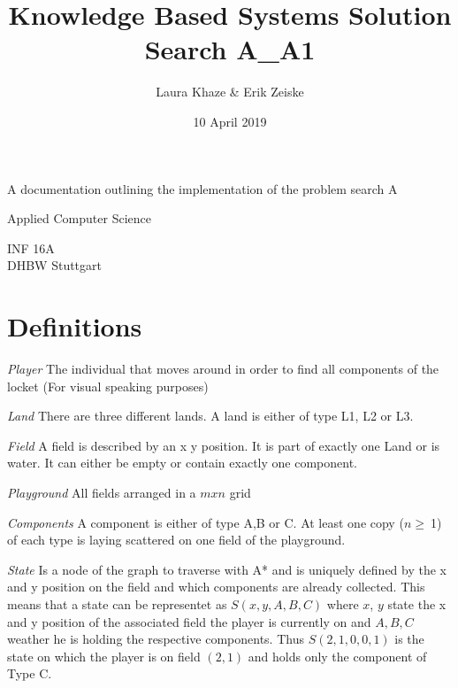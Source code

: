 \documentclass{article}
\title{Knowledge Based Systems Solution Search A\_A1}
\author{Laura Khaze \& Erik Zeiske}
\date{10 April 2019}
\begin{document}
\begin{titlepage}
    \begin{center}
        \vspace*{1cm}
 
        \Huge
        \textbf{\@title}
 
        \vspace{0.5cm}
        \LARGE
        A documentation outlining the implementation of the problem search A
 
        \vspace{1.5cm}
 
        \textbf{\@author}
 
        \vfill
 
        Applied Computer Science
 
 
        INF 16A\\
        DHBW Stuttgart\\
        \@date
 
    \end{center}
\end{titlepage}
\tableofcontents
\newpage
\section{Definitions}
\begin{description}
    \item{\textit{Player}} The individual that moves around in order to find all components of the locket (For visual speaking purposes)
    \item{\textit{Land}} There are three different lands. A land is either of type L1, L2 or L3.
    \item{\textit{Field}} A field is described by an x y position. It is part of exactly one Land or is water. It can either be empty or contain exactly one component.
    \item{\textit{Playground}} All fields arranged in a $m x n$ grid
    \item{\textit{Components}} A component is either of type A,B or C. At least one copy ($n \geq \ $1) of each type is laying scattered on one field of the playground.
    \item{\textit{State}} \label{definition_state} Is a node of the graph to traverse with A* and is uniquely defined by the x and y position on the field and which components are already collected. This means that a state can be representet as $S(x,y,A,B,C)$ where $x$, $y$ state the x and y position of the associated field the player is currently on and $A, B, C$ weather he is holding the respective components. Thus $S(2,1,0,0,1)$ is the state on which the player is on field $(2,1)$ and holds only the component of Type C.
\end{description}
\end{document}
